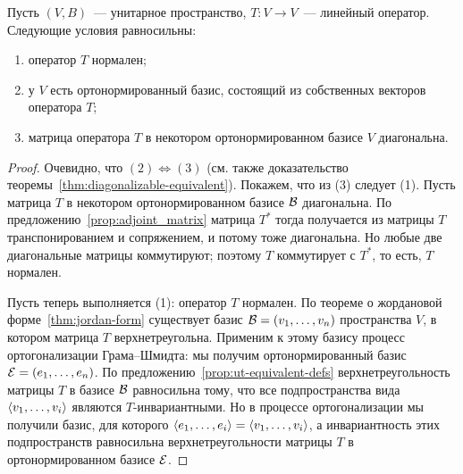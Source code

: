 \begin{theorem}\label{thm:spectral-unitary}
Пусть $(V,B)$~--- унитарное пространство,
$T\colon V\to V$~--- линейный оператор.
Следующие условия равносильны:
\begin{enumerate}
\item оператор $T$ нормален;
\item у $V$ есть ортонормированный базис, состоящий из собственных
векторов оператора $T$;
\item матрица оператора $T$ в некотором ортонормированном базисе
$V$ диагональна.
\end{enumerate}
\end{theorem}
\begin{proof}
Очевидно, что $(2)\Leftrightarrow(3)$ (см. также
доказательство теоремы~\ref{thm:diagonalizable-equivalent}).
Покажем, что из (3) следует (1). Пусть матрица $T$ в некотором
ортонормированном базисе $\mathcal B$ диагональна.
По предложению~\ref{prop:adjoint_matrix}
матрица $T^*$ тогда получается из матрицы $T$ транспонированием
и сопряжением, и потому тоже диагональна. Но любые две диагональные
матрицы коммутируют; поэтому $T$ коммутирует с $T^*$,
то есть, $T$ нормален.

Пусть теперь выполняется (1): оператор $T$ нормален.
По теореме о жордановой форме~\ref{thm:jordan-form} существует
базис $\mathcal B = (v_1,\dots,v_n)$ пространства $V$, в котором матрица $T$
верхнетреугольна. Применим к этому базису процесс ортогонализации
Грама--Шмидта: мы получим ортонормированный базис 
$\mathcal E = (e_1,\dots,e_n)$.
По предложению~\ref{prop:ut-equivalent-defs} верхнетреугольность
матрицы $T$ в базисе $\mathcal B$ равносильна тому, что
все подпространства вида $\langle v_1,\dots,v_i\rangle$ являются
$T$-инвариантными. Но в процессе ортогонализации
мы получили базис, для которого
$\langle e_1,\dots,e_i\rangle = \langle v_1,\dots,v_i\rangle$,
а инвариантность этих подпространств равносильна
верхнетреугольности матрицы $T$ в ортонормированном базисе $\mathcal E$.


\end{proof}
